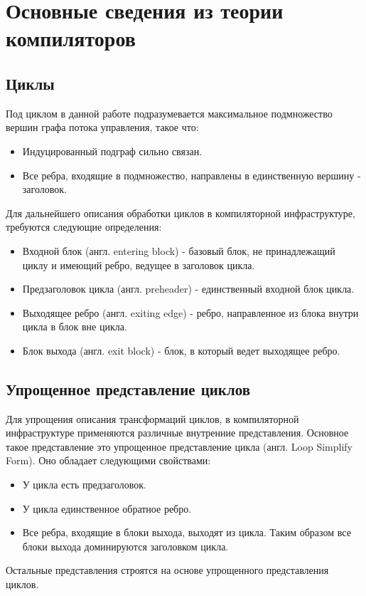\chapter{Основные сведения из теории компиляторов}
\label{sec:Chapter1} 

\section{Циклы}

Под циклом в данной работе подразумевается максимальное подмножество вершин графа потока управления, такое что:
\begin{itemize}
    \item Индуцированный подграф сильно связан.
    \item Все ребра, входящие в подмножество, направлены в единственную вершину - заголовок.
\end{itemize}

Для дальнейшего описания обработки циклов в компиляторной инфраструктуре, требуются следующие определения:
\begin{itemize}
    \item Входной блок (англ. entering block) - базовый блок, не принадлежащий циклу и имеющий ребро, ведущее в заголовок цикла.
    \item Предзаголовок цикла (англ. preheader) - единственный входной блок цикла.
    \item Выходящее ребро (англ. exiting edge) - ребро, направленное из блока внутри цикла в блок вне цикла.
    \item Блок выхода (англ. exit block) - блок, в который ведет выходящее ребро.
\end{itemize}

\section{Упрощенное представление циклов}

Для упрощения описания трансформаций циклов, в компиляторной инфраструктуре применяются различные внутренние представления.
Основное такое представление это упрощенное представление цикла (англ. Loop Simplify Form).
Оно обладает следующими свойствами:
\begin{itemize}
    \item У цикла есть предзаголовок.
    \item У цикла единственное обратное ребро.
    \item Все ребра, входящие в блоки выхода, выходят из цикла. Таким образом все блоки выхода доминируются заголовком цикла.
\end{itemize}
Остальные представления строятся на основе упрощенного представления циклов.

